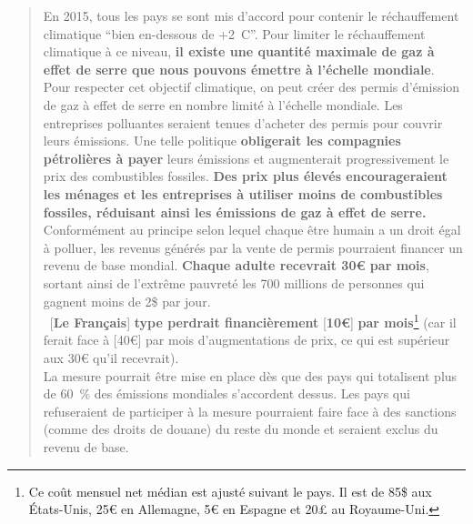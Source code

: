 \documentclass[a5paper,french]{memoir}
\begin{document}
\begin{quote}
En 2015, tous les pays se sont mis d'accord pour contenir le réchauffement climatique ``bien en-dessous de +2~\textdegree{}C''. Pour limiter le réchauffement climatique à ce niveau, \textbf{il existe une quantité maximale de gaz à effet de serre que nous pouvons émettre à l'échelle mondiale}. \\
Pour respecter cet objectif climatique, on peut créer des permis d'émission de gaz à effet de serre en nombre limité à l'échelle mondiale. Les entreprises polluantes seraient tenues d'acheter des permis pour couvrir leurs émissions. Une telle politique \textbf{obligerait les compagnies pétrolières à payer} leurs émissions et augmenterait progressivement le prix des combustibles fossiles. \textbf{Des prix plus élevés encourageraient les ménages et les entreprises à utiliser moins de combustibles fossiles, réduisant ainsi les émissions de gaz à effet de serre.} \\
Conformément au principe selon lequel chaque être humain a un droit égal à polluer, les revenus générés par la vente de permis pourraient financer un revenu de base mondial. \textbf{Chaque adulte recevrait 30\euro{} par mois}, sortant ainsi de l'extrême pauvreté les 700 millions de personnes qui gagnent moins de 2\$ par jour. \\
~[\textbf{Le Français}]\textbf{ type perdrait financièrement }[\textbf{10\euro{}}]\textbf{ par mois}\footnote{Ce coût mensuel net médian est ajusté suivant le pays. Il est de 85\$ aux États-Unis, 25\euro{} en Allemagne, 5\euro{} en Espagne et 20£ au Royaume-Uni.} (car il ferait face à [40\euro{}] par mois d'augmentations de prix, ce qui est supérieur aux 30\euro{} qu'il recevrait). \\
La mesure pourrait être mise en place dès que des pays qui totalisent plus de 60~\% des émissions mondiales s'accordent dessus. Les pays qui refuseraient de participer à la mesure pourraient faire face à des sanctions (comme des droits de douane) du reste du monde et seraient exclus du revenu de base.
\end{quote}
\end{document}
